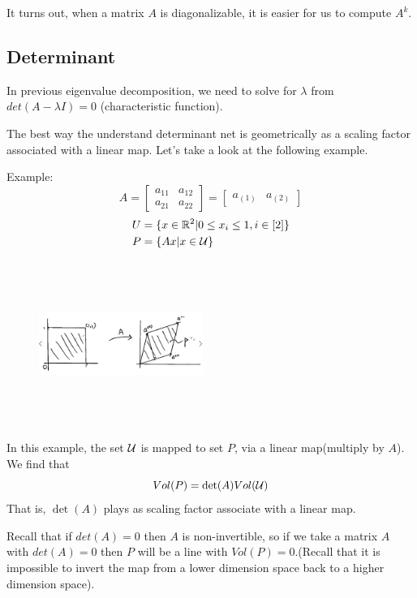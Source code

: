 It turns out, when a matrix $A$ is diagonalizable, it is easier for us to compute $A^k$.



\subsection{Determinant}

In previous eigenvalue decomposition, we need to solve for $\lambda$ from $det(A - \lambda I) = 0$ (characteristic function). 

The best way the understand determinant net is geometrically as a scaling factor associated with a linear map. Let's take a look at the following example.



Example:
$$A = 
\begin{bmatrix}
a_{11} & a_{12}\\
a_{21} & a_{22}
\end{bmatrix}
=
\begin{bmatrix}
a_{(1)} & a_{(2)}
\end{bmatrix}
$$
\begin{align*}
U &= \{x\in \mathbb{R}^2 | 0\leq x_i \leq 1, i\in [2]\}\\
P &= \{Ax| x\in \mathcal{U}\} 
\end{align*}
\begin{figure}
	\centering
	\includegraphics[width=2.1in,height=2.1in]{figures/ch03/figure1.jpg}
\end{figure}

In this example, the set $\cal{U}$ is mapped to set $P$, via a linear map(multiply by $A$). We find that
$$Vol(P)=\det(A) Vol(\cal{U})$$
That is, $\det(A)$ plays as scaling factor associate with a linear map. 

Recall that if $det(A) = 0$ then $A$ is non-invertible, so if we take a matrix $A$ with $det(A) = 0$ then $P$ will be a line with $Vol(P)=0$.(Recall that it is impossible to invert the map from a lower dimension space back to a higher dimension space).


